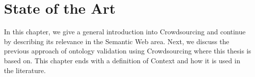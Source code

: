 \chapter{State of the Art}\label{chap:state_of_the_art}
In this chapter, we give a general introduction into Crowdsourcing and continue by describing its relevance in the Semantic Web area. Next, we discuss the previous approach of ontology validation using Crowdsourcing where this thesis is based on. This chapter ends with a definition of Context and how it is used in the literature.













